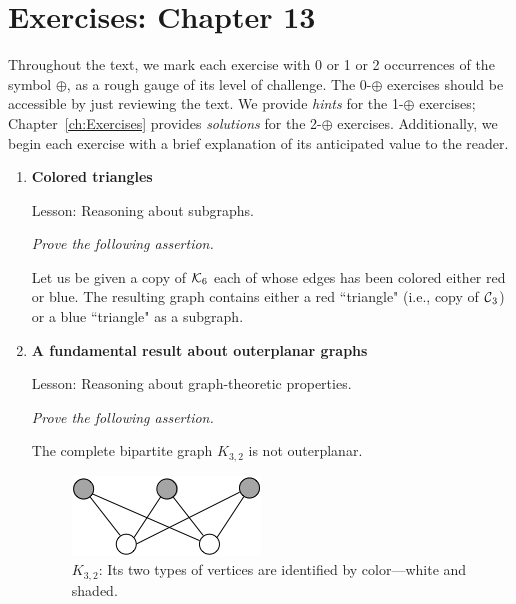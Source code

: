 
\section{Exercises: Chapter 13}

Throughout the text, we mark each exercise with 0 or 1 or 2
occurrences of the symbol $\oplus$, as a rough gauge of its level of
challenge.  The 0-$\oplus$ exercises should be accessible by just
reviewing the text.  We provide {\em hints} for the 1-$\oplus$
exercises; Chapter~\ref{ch:Exercises} provides {\em solutions} for the
2-$\oplus$ exercises.  Additionally, we begin each exercise with a
brief explanation of its anticipated value to the reader.
 

\begin{enumerate}
\item
{\bf Colored triangles}

{\sc Lesson:} Reasoning about subgraphs.

\smallskip

{\em Prove the following assertion.}

\begin{prop}
Let us be given a copy of $\mbox{$\cal K$}_6$ each of whose edges has been colored either red or blue.  The resulting graph contains either a red ``triangle" (i.e., copy of $\mbox{$\cal C$}_3$) or a blue ``triangle" as a subgraph.
\end{prop}

\item
{\bf A fundamental result about outerplanar graphs}

{\sc Lesson:} Reasoning about graph-theoretic properties.


\smallskip

{\em Prove the following assertion.}

\begin{prop}
The complete bipartite graph $K_{3,2}$ is not outerplanar.
\end{prop}

\begin{figure}[h]
\begin{center}
        \includegraphics[scale=0.35]{FiguresGraph/outerplanarK3,2init} 
\caption{$K_{3,2}$: Its two types of vertices are identified by color---white and shaded.}
\end{center}
\end{figure}


\end{enumerate}
